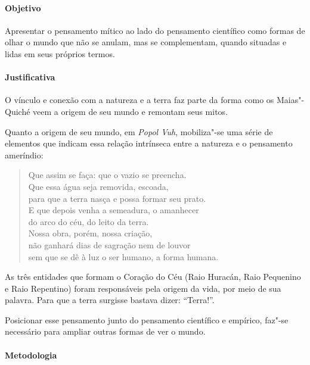 \documentclass[12pt]{extarticle}
\begin{document}
\paragraph{Objetivo} Apresentar o pensamento mítico ao lado do pensamento científico
como formas de olhar o mundo que não se anulam, mas se complementam, quando situadas e 
lidas em seus próprios termos. 

\paragraph{Justificativa} O vínculo e conexão com a natureza e a terra faz parte da forma como 
os Maias"-Quiché veem a origem de seu mundo e remontam seus mitos. 

Quanto a origem de seu mundo, em \emph{Popol Vuh}, mobiliza"-se uma série de elementos que indicam essa 
relação intrínseca entre a natureza e o pensamento ameríndio: 

\begin{verse}
Que assim se faça: que o vazio se preencha.\\
Que essa água seja removida, escoada,\\
para que a terra nasça e possa formar seu prato.\\
E que depois venha a semeadura, o amanhecer\\
do arco do céu, do leito da terra.\\
Nossa obra, porém, nossa criação,\\
não ganhará dias de sagração nem de louvor\\
sem que se dê à luz o ser humano, a forma humana.\\
\end{verse}

As três entidades que formam o Coração do Céu (Raio Huracán, Raio Pequenino e Raio Repentino) 
foram responsáveis pela origem da vida, por meio de sua palavra. 
Para que a terra surgisse bastava dizer: ``Terra!''.

Posicionar esse pensamento junto do pensamento científico e empírico, faz"-se necessário 
para ampliar outras formas de ver o mundo. 

\paragraph{Metodologia} 
\end{document}
